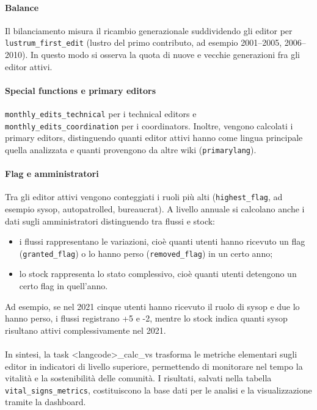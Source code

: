 \paragraph{Balance}  
Il bilanciamento misura il ricambio generazionale suddividendo gli editor per \texttt{lustrum\_first\_edit} (lustro del primo contributo, ad esempio 2001--2005, 2006--2010). 
In questo modo si osserva la quota di nuove e vecchie generazioni fra gli editor attivi.

\paragraph{Special functions e primary editors}  
\texttt{monthly\_edits\_technical} per i technical editors e \texttt{monthly\_edits\_coordination} per i coordinators. 
Inoltre, vengono calcolati i primary editors, distinguendo quanti editor attivi hanno come lingua principale quella analizzata e quanti provengono da altre wiki (\texttt{primarylang}).

\paragraph{Flag e amministratori}  
Tra gli editor attivi vengono conteggiati i ruoli più alti (\texttt{highest\_flag}, ad esempio sysop, autopatrolled, bureaucrat). 
A livello annuale si calcolano anche i dati sugli amministratori distinguendo tra flussi e stock:  
\begin{itemize}
  \item i flussi rappresentano le variazioni, cioè quanti utenti hanno ricevuto un flag (\texttt{granted\_flag}) o lo hanno perso (\texttt{removed\_flag}) in un certo anno;  
  \item lo stock rappresenta lo stato complessivo, cioè quanti utenti detengono un certo flag in quell’anno.  
\end{itemize}
Ad esempio, se nel 2021 cinque utenti hanno ricevuto il ruolo di sysop e due lo hanno perso, i flussi registrano +5 e -2, mentre lo stock indica quanti sysop risultano attivi complessivamente nel 2021.

\paragraph{}  
In sintesi, la task \textless langcode\textgreater\_calc\_vs trasforma le metriche elementari sugli editor in indicatori di livello superiore, permettendo di monitorare nel tempo la vitalità e la sostenibilità delle comunità. I risultati, salvati nella tabella \texttt{vital\_signs\_metrics}, costituiscono la base dati per le analisi e la visualizzazione tramite la dashboard.

